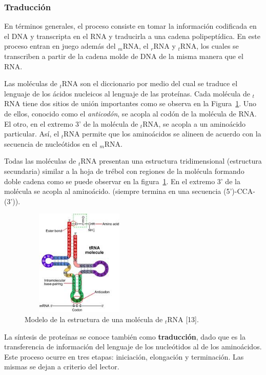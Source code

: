 \subsubsection{Traducción} 
\label{sintesisProteica}
En términos generales, el proceso consiste en tomar la información codificada en el DNA y transcripta en el RNA y traducirla a una cadena polipeptídica.
En este proceso entran en juego además del $_m$RNA, el $_r$RNA y $_t$RNA, los cuales se transcriben a partir de la cadena molde de DNA de la misma manera que el RNA.

Las moléculas de $_t$RNA  son el diccionario por medio del cual se traduce el lenguaje de los ácidos nucleicos al lenguaje de las proteínas. Cada molécula de $_t$RNA  tiene dos sitios de unión importantes como se observa en la Figura~\ref{ARNt}. Uno de ellos, conocido como el \textit{anticodón}, se acopla al codón de la molécula de RNA. El otro, en el extremo 3' de la molécula de $_t$RNA, se acopla a un aminoácido particular. Así, el $_t$RNA  permite que los aminoácidos se alineen de acuerdo con la secuencia de nucleótidos en el $_m$RNA.
\par Todas las moléculas de $_t$RNA  presentan una estructura tridimensional (estructura secundaria) similar a la hoja de trébol con regiones de la molécula formando doble cadena como se puede observar en la figura~\ref{ARNt}. En el extremo 3' de la molécula se acopla al aminoácido. (siempre termina en una secuencia (5')-CCA-(3')).

\begin{figure} [h]
	\hspace*{4cm}\includegraphics[width=2.2209in,height=2.0000in]{image/rnat1.jpg}
	\caption{Modelo de la estructura de una molécula de $_t$RNA [13].}	
	\label{ARNt}
\end{figure}		

La síntesis de proteínas se conoce también como \textbf{traducción}, dado que es la transferencia de información del lenguaje de los nucleótidos al de los aminoácidos. Este proceso ocurre en tres etapas: iniciación, elongación y terminación. Las mismas se dejan a criterio del lector.


